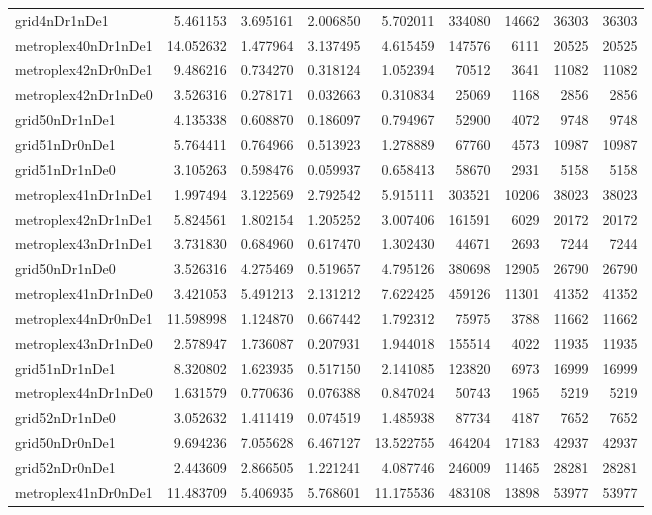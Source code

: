 \begin{longtable}{|l|r|r|r|r|r|r|r|r|}
grid4nDr1nDe1 & 5.461153 & 3.695161 & 2.006850 & 5.702011 & 334080 & 14662 & 36303 & 36303 \\
metroplex40nDr1nDe1 & 14.052632 & 1.477964 & 3.137495 & 4.615459 & 147576 & 6111 & 20525 & 20525 \\
metroplex42nDr0nDe1 & 9.486216 & 0.734270 & 0.318124 & 1.052394 & 70512 & 3641 & 11082 & 11082 \\
metroplex42nDr1nDe0 & 3.526316 & 0.278171 & 0.032663 & 0.310834 & 25069 & 1168 & 2856 & 2856 \\
grid50nDr1nDe1 & 4.135338 & 0.608870 & 0.186097 & 0.794967 & 52900 & 4072 & 9748 & 9748 \\
grid51nDr0nDe1 & 5.764411 & 0.764966 & 0.513923 & 1.278889 & 67760 & 4573 & 10987 & 10987 \\
grid51nDr1nDe0 & 3.105263 & 0.598476 & 0.059937 & 0.658413 & 58670 & 2931 & 5158 & 5158 \\
metroplex41nDr1nDe1 & 1.997494 & 3.122569 & 2.792542 & 5.915111 & 303521 & 10206 & 38023 & 38023 \\
metroplex42nDr1nDe1 & 5.824561 & 1.802154 & 1.205252 & 3.007406 & 161591 & 6029 & 20172 & 20172 \\
metroplex43nDr1nDe1 & 3.731830 & 0.684960 & 0.617470 & 1.302430 & 44671 & 2693 & 7244 & 7244 \\
grid50nDr1nDe0 & 3.526316 & 4.275469 & 0.519657 & 4.795126 & 380698 & 12905 & 26790 & 26790 \\
metroplex41nDr1nDe0 & 3.421053 & 5.491213 & 2.131212 & 7.622425 & 459126 & 11301 & 41352 & 41352 \\
metroplex44nDr0nDe1 & 11.598998 & 1.124870 & 0.667442 & 1.792312 & 75975 & 3788 & 11662 & 11662 \\
metroplex43nDr1nDe0 & 2.578947 & 1.736087 & 0.207931 & 1.944018 & 155514 & 4022 & 11935 & 11935 \\
grid51nDr1nDe1 & 8.320802 & 1.623935 & 0.517150 & 2.141085 & 123820 & 6973 & 16999 & 16999 \\
metroplex44nDr1nDe0 & 1.631579 & 0.770636 & 0.076388 & 0.847024 & 50743 & 1965 & 5219 & 5219 \\
grid52nDr1nDe0 & 3.052632 & 1.411419 & 0.074519 & 1.485938 & 87734 & 4187 & 7652 & 7652 \\
grid50nDr0nDe1 & 9.694236 & 7.055628 & 6.467127 & 13.522755 & 464204 & 17183 & 42937 & 42937 \\
grid52nDr0nDe1 & 2.443609 & 2.866505 & 1.221241 & 4.087746 & 246009 & 11465 & 28281 & 28281 \\
metroplex41nDr0nDe1 & 11.483709 & 5.406935 & 5.768601 & 11.175536 & 483108 & 13898 & 53977 & 53977 \\

\end{longtable}
